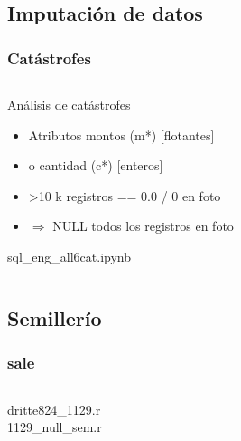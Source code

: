 \documentclass[aspectratio=169]{beamer} %
\begin{document}
\subsection{Imputación de datos}

\begin{frame}
  \frametitle{Catástrofes}
  \begin{columns}[onlytextwidth]
    \begin{column}{.6\textwidth}
      \begin{block}{Análisis de catástrofes}
        \begin{itemize}
          \item Atributos montos (m*) [flotantes]
          \item o cantidad (c*) [enteros]
          \item \textgreater 10 k registros == 0.0 / 0 en foto
          \item $\Rightarrow$ NULL todos los registros en foto
        \end{itemize}
        {\tiny sql\_eng\_all6cat.ipynb}
      \end{block}
    \end{column}
  \end{columns}      
\end{frame}



\subsection{Semillerío}

\begin{frame}
  \frametitle{sale}
  \begin{columns}[onlytextwidth]
    \begin{column}{.6\textwidth}
        {\tiny dritte824\_1129.r}\\
        {\tiny 1129\_null\_sem.r}
    \end{column}
  \end{columns}      
\end{frame}
\end{document}
